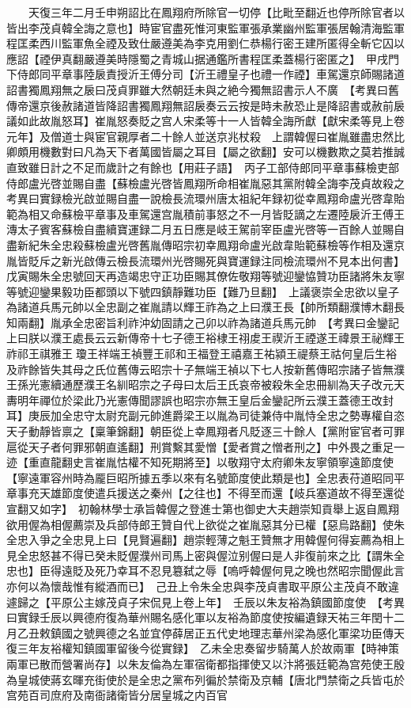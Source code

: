 　　天復三年二月壬申朔詔比在鳳翔府所除官一切停【比毗至翻近也停所除官者以皆出李茂貞韓全誨之意也】時宦官盡死惟河東監軍張承業幽州監軍張居翰清海監軍程匡柔西川監軍魚全禋及致仕嚴遵美為李克用劉仁恭楊行密王建所匿得全斬它囚以應詔【禋伊真翻嚴遵美時隱蜀之青城山据通鑑所書程匡柔蓋楊行密匿之】　甲戌門下侍郎同平章事陸扆責授沂王傅分司【沂王禮皇子也禮一作禋】車駕還京師賜諸道詔書獨鳳翔無之扆曰茂貞罪雖大然朝廷未與之絶今獨無詔書示人不廣　【考異曰舊傳帝還京後赦諸道皆降詔書獨鳳翔無詔扆奏云云按是時未赦恐止是降詔書或赦前扆議如此故胤怒耳】崔胤怒奏貶之宫人宋柔等十一人皆韓全誨所獻【獻宋柔等見上卷元年】及僧道士與宦官親厚者二十餘人並送京兆杖殺　上謂韓偓曰崔胤雖盡忠然比卿頗用機數對曰凡為天下者萬國皆屬之耳目【屬之欲翻】安可以機數欺之莫若推誠直致雖日計之不足而歲計之有餘也【用莊子語】　丙子工部侍郎同平章事蘇檢吏部侍郎盧光啓並賜自盡【蘇檢盧光啓皆鳳翔所命相崔胤惡其黨附韓全誨李茂貞故殺之　考異曰實録檢光啟並賜自盡一說檢長流環州唐太祖紀年録初從幸鳳翔命盧光啓韋貽範為相又命蘇檢平章事及車駕還宫胤積前事怒之不一月皆貶謫之左遷陸扆沂王傅王漙太子賓客蘇檢自盡續寶運録二月五日應是岐王駕前宰臣盧光啓等一百餘人並賜自盡新紀朱全忠殺蘇檢盧光啓舊胤傳昭宗初幸鳳翔命盧光啟韋貽範蘇檢等作相及還京胤皆貶斥之新光啟傳云檢長流環州光啓賜死與寶運録注同檢流環州不見本出何書】　戊寅賜朱全忠號回天再造竭忠守正功臣賜其僚佐敬翔等號迎鑾恊贊功臣諸將朱友寧等號迎鑾果毅功臣都頭以下號四鎮靜難功臣【難乃旦翻】　上議褒崇全忠欲以皇子為諸道兵馬元帥以全忠副之崔胤請以輝王祚為之上曰濮王長【帥所類翻濮博木翻長知兩翻】胤承全忠密旨利祚沖幼固請之己卯以祚為諸道兵馬元帥　【考異曰金鑾記上曰朕以濮王處長云云新傳帝十七子德王裕棣王祤䖍王禊沂王禋遂王禕景王祕輝王祚祁王祺雅王瓊王祥端王禎豐王祁和王福登王禧嘉王祐潁王禔蔡王祜何皇后生裕及祚餘皆失其母之氏位舊傳云昭宗十子無端王禎以下七人按新舊傳昭宗諸子皆無濮王孫光憲續通歷濮王名紃昭宗之子母曰太后王氏哀帝被殺朱全忠冊紃為天子改元天夀明年禪位於梁此乃光憲傳聞謬誤也昭宗亦無王皇后金鑾記所云濮王蓋德王改封耳】庚辰加全忠守太尉充副元帥進爵梁王以胤為司徒兼侍中胤恃全忠之勢專權自恣天子動靜皆禀之【稟筆錦翻】朝臣從上幸鳳翔者凡貶逐三十餘人【黨附宦官者可罪扈從天子者何罪邪朝直遙翻】刑賞繫其愛憎【愛者賞之憎者刑之】中外畏之重足一迹【重直龍翻史言崔胤怙權不知死期將至】以敬翔守太府卿朱友寧領寧遠節度使【寧遠軍容州時為龎巨昭所據五季以來有名號節度使此類是也】全忠表苻道昭同平章事充天雄節度使遣兵援送之秦州【之往也】不得至而還【岐兵塞道故不得至還從宣翻又如字】　初翰林學士承旨韓偓之登進士第也御史大夫趙崇知貢舉上返自鳳翔欲用偓為相偓薦崇及兵部侍郎王贊自代上欲從之崔胤惡其分已權【惡烏路翻】使朱全忠入爭之全忠見上曰【見賢遍翻】趙崇輕薄之魁王贊無才用韓偓何得妄薦為相上見全忠怒甚不得已癸未貶偓濮州司馬上密與偓泣别偓曰是人非復前來之比【謂朱全忠也】臣得遠貶及死乃幸耳不忍見簒弑之辱【嗚呼韓偓何見之晚也然昭宗聞偓此言亦何以為懷哉惟有縱酒而已】　己丑上令朱全忠與李茂貞書取平原公主茂貞不敢違遽歸之【平原公主嫁茂貞子宋侃見上卷上年】　壬辰以朱友裕為鎮國節度使　【考異曰實録壬辰以興德府復為華州賜名感化軍以友裕為節度使按編遺録天祐三年閏十二月乙丑敕鎮國之號興德之名並宜停薛居正五代史地理志華州梁為感化軍梁功臣傳天復三年友裕權知鎮國軍留後今從實録】　乙未全忠奏留步騎萬人於故兩軍【時神策兩軍已散而營署尚存】以朱友倫為左軍宿衛都指揮使又以汴將張廷範為宫苑使王殷為皇城使蔣玄暉充街使於是全忠之黨布列徧於禁衛及京輔【唐北門禁衛之兵皆屯於宫苑百司庶府及南衙諸衛皆分居皇城之内百官